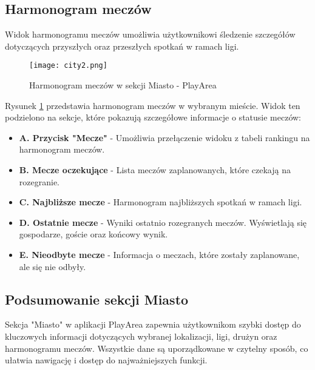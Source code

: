 \documentclass[wmii,inf,inz]{uwmthesis} %
\begin{document}
\subsection{Harmonogram meczów}
Widok harmonogramu meczów umożliwia użytkownikowi śledzenie szczegółów dotyczących przyszłych oraz przeszłych spotkań w ramach ligi.

\begin{figure}[H]
    \centering
    \texttt{[image: city2.png]}
    \caption{Harmonogram meczów w sekcji Miasto - PlayArea}
    \label{fig:city_matches}
\end{figure}

\noindent
Rysunek \ref{fig:city_matches} przedstawia harmonogram meczów w wybranym mieście. Widok ten podzielono na sekcje, które pokazują szczegółowe informacje o statusie meczów:
\begin{itemize}
    \item \textbf{A. Przycisk "Mecze"} - Umożliwia przełączenie widoku z tabeli rankingu na harmonogram meczów.
    \item \textbf{B. Mecze oczekujące} - Lista meczów zaplanowanych, które czekają na rozegranie.
    \item \textbf{C. Najbliższe mecze} - Harmonogram najbliższych spotkań w ramach ligi.
    \item \textbf{D. Ostatnie mecze} - Wyniki ostatnio rozegranych meczów. Wyświetlają się gospodarze, goście oraz końcowy wynik.
    \item \textbf{E. Nieodbyte mecze} - Informacja o meczach, które zostały zaplanowane, ale się nie odbyły.
\end{itemize}

\subsection{Podsumowanie sekcji Miasto}
Sekcja "Miasto" w aplikacji PlayArea zapewnia użytkownikom szybki dostęp do kluczowych informacji dotyczących wybranej lokalizacji, ligi, drużyn oraz harmonogramu meczów. Wszystkie dane są uporządkowane w czytelny sposób, co ułatwia nawigację i dostęp do najważniejszych funkcji.
\end{document}
